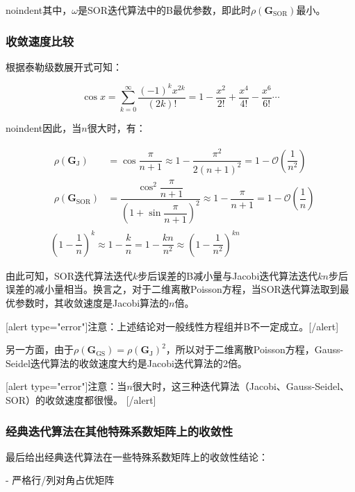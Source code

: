 \documentclass[12pt, UTF8, nofonts]{ctexart}
\begin{document}
noindent其中，$\omega$是SOR迭代算法中的B最优参数，即此时$\rho(\boldsymbol{G}_{\mathrm{SOR}})$最小。

\subsubsection*{收敛速度比较}

根据泰勒级数展开式可知：

\[
    \cos x = \sum_{k=0}^\infty \dfrac{(-1)^{k} x^{2k}}{(2k)!} = 1 - \dfrac{x^2}{2!} + \dfrac{x^4}{4!} - \dfrac{x^6}{6!} \cdots
\]

noindent因此，当$n$很大时，有：

\begin{eqnarray*}
    & \begin{aligned}
        \rho(\boldsymbol{G}_{\mathrm{J}}) &= \cos\dfrac{\pi}{n+1} \approx 1 - \dfrac{\pi^2}{2(n+1)^2} = 1 - \mathcal{O}(\dfrac{1}{n^2}) \\
        \rho(\boldsymbol{G}_{\mathrm{SOR}}) &= \dfrac{\cos^2 \dfrac{\pi}{n+1}}{\left(1+\sin\dfrac{\pi}{n+1}\right)^2} \approx 1 - \dfrac{\pi}{n+1} = 1 - \mathcal{O}\left(\dfrac{1}{n}\right)
    \end{aligned} \\
    & \left(1-\dfrac{1}{n}\right)^k \approx 1 - \dfrac{k}{n} = 1- \dfrac{kn}{n^2} \approx \left(1-\dfrac{1}{n^2}\right)^{kn}
\end{eqnarray*}

由此可知，SOR迭代算法迭代$k$步后误差的B减小量与Jacobi迭代算法迭代$kn$步后误差的减小量相当。换言之，对于二维离散Poisson方程，当SOR迭代算法取到最优参数时，其收敛速度是Jacobi算法的$n$倍。

[alert type="error"]注意：上述结论对一般线性方程组并B不一定成立。[/alert]

另一方面，由于$\rho(\boldsymbol{G}_{\mathrm{GS}})=\rho(\boldsymbol{G}_{\mathrm{J}})^2$，所以对于二维离散Poisson方程，Gauss-Seidel迭代算法的收敛速度大约是Jacobi迭代算法的$2$倍。

[alert type="error"]注意：当$n$很大时，这三种迭代算法（Jacobi、Gauss-Seidel、SOR）的收敛速度都很慢。 [/alert]

\subsubsection*{经典迭代算法在其他特殊系数矩阵上的收敛性}

最后给出经典迭代算法在一些特殊系数矩阵上的收敛性结论：

- 严格行/列对角占优矩阵
\end{document}
